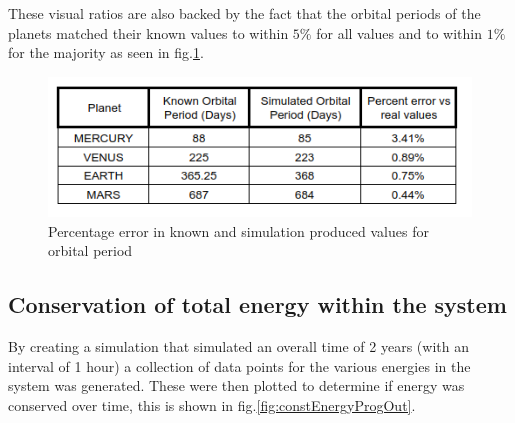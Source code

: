 \documentclass{article}
\begin{document}
                These visual ratios are also backed by the fact that the orbital periods of the
                planets matched their known values to within $5\%$ for all values and to within 
                $1\%$ for the majority as seen in fig.\ref{fig:prodLabel}.
                 
                \begin{figure}
                    \centering
                    \includegraphics[width = 0.5\linewidth]{Figures/RatiosToRealValues.png}
                    \caption{Percentage error in known\cite{PlanetDat} and simulation produced
                    values for orbital period}
                    \label{fig:prodLabel}
                \end{figure}
                

            \pagebreak
            \subsection{Conservation of total energy within the system}
                By creating a simulation that simulated an overall time of 2 years (with an interval 
                of 1 hour) a collection of data points for the various energies in the system was 
                generated. These were then plotted to determine if energy was conserved over time, 
                this is shown in fig.\ref{fig:constEnergyProgOut}. 
                
\end{document}
